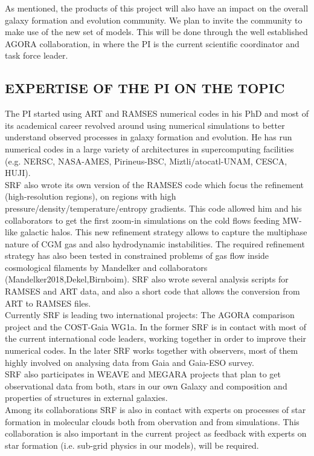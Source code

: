 \documentclass[oneside, a4paper, onecolumn, 11pt]{article}
\begin{document}
As mentioned, the products of this project will also have an impact on the overall galaxy formation and evolution community. We plan to invite the community to make use of the new set of models. This will be done through the well established AGORA collaboration, in where the PI is the current scientific coordinator and task force leader. 


\subsection*{ EXPERTISE OF THE PI ON THE TOPIC}

The PI started using ART and RAMSES numerical codes in his PhD and most of its academical career revolved around using numerical simulations to better understand observed processes in galaxy formation and evolution. He has run numerical codes in a large variety of architectures in supercomputing facilities (e.g. NERSC, NASA-AMES, Pirineus-BSC, Miztli/atocatl-UNAM, CESCA, HUJI).\\
SRF also wrote its own version of the RAMSES code which focus the refinement (high-resolution regions), on regions with high pressure/density/temperature/entropy gradients. This code allowed him and his collaborators to get the first zoom-in simulations on the cold flows feeding MW-like galactic halos. This new refinement strategy allows to capture the multiphase nature of CGM gas and also hydrodynamic instabilities. The required refinement strategy has also been tested in constrained problems of gas flow inside cosmological filaments by Mandelker and collaborators (Mandelker2018,Dekel,Birnboim). SRF also wrote several analysis scripts for RAMSES and ART data, and also a short code that allows the conversion from ART to RAMSES files.\\
Currently SRF is leading two international projects: The AGORA comparison project and the COST-Gaia WG1a. In the former SRF is in contact with most of the current international code leaders, working together in order to improve their numerical codes. In the later SRF works together with observers, most of them highly involved on analysing data from Gaia and Gaia-ESO survey.\\
SRF also participates in WEAVE and MEGARA projects that plan to get observational data from both, stars in our own Galaxy and composition and properties of structures in external galaxies.\\
Among its collaborations SRF is also in contact with experts on processes of star formation in molecular clouds both from obervation and from simulations. This collaboration is also important in the current project as feedback with experts on star formation (i.e. sub-grid physics in our models), will be required.
\end{document}

